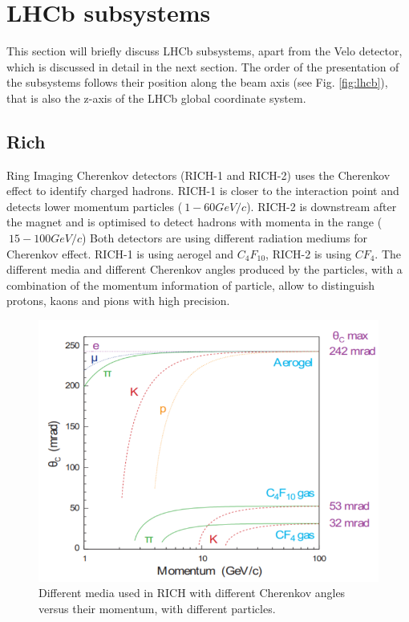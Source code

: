 \section{LHCb subsystems}

This section will briefly discuss LHCb subsystems, apart from the Velo detector, which is discussed in detail in the next section.
The order of the presentation of the subsystems follows their position along the beam axis (see Fig. \ref{fig:lhcb}), that is also the z-axis of the LHCb global coordinate system.

\subsection{Rich}
Ring Imaging Cherenkov detectors (RICH-1 and RICH-2) uses the Cherenkov effect to identify charged hadrons.
RICH-1 is closer to the interaction point and detects lower momentum particles ($~1-60GeV/c$). RICH-2 is downstream after the magnet and is optimised to detect hadrons with momenta in the range ($~15-100GeV/c$)
Both detectors are using different radiation mediums for Cherenkov effect. RICH-1 is using aerogel and $C_{4}F_{10}$, RICH-2 is using $CF_{4}$.
The different media and different Cherenkov angles produced by the particles, with a combination of the momentum information of particle, allow to distinguish protons, kaons and pions with high precision.


\begin{figure}
  \centering
  \includegraphics[width=0.55\linewidth]{figures/chapter2/cherenkov_mediums.png}
  \caption{Different media used in RICH with different Cherenkov angles versus their momentum, with different particles.}
  \label{fig:cherenkov_media}
\end{figure}

